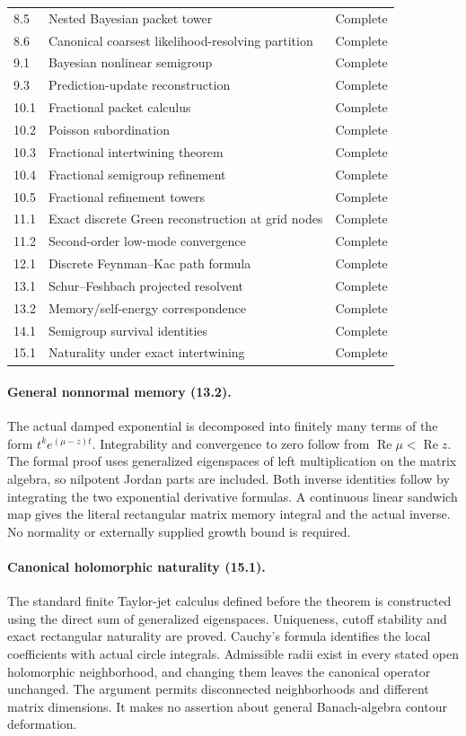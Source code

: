 \documentclass[11pt,letterpaper]{article}
\theoremstyle{plain}
\theoremstyle{plain}
\theoremstyle{plain}
\theoremstyle{definition}
\theoremstyle{definition}
\theoremstyle{definition}
\theoremstyle{definition}
\theoremstyle{definition}
\theoremstyle{remark}
\theoremstyle{remark}
\theoremstyle{remark}
\theoremstyle{remark}
\theoremstyle{remark}
\theoremstyle{remark}
\begin{document}
\begin{longtable}{@{}p{}p{}p{}@{}}
8.5 & Nested Bayesian packet tower & Complete\\
8.6 & Canonical coarsest likelihood-resolving partition & Complete\\
9.1 & Bayesian nonlinear semigroup & Complete\\
9.3 & Prediction-update reconstruction & Complete\\
10.1 & Fractional packet calculus & Complete\\
10.2 & Poisson subordination & Complete\\
10.3 & Fractional intertwining theorem & Complete\\
10.4 & Fractional semigroup refinement & Complete\\
10.5 & Fractional refinement towers & Complete\\
11.1 & Exact discrete Green reconstruction at grid nodes & Complete\\
11.2 & Second-order low-mode convergence & Complete\\
12.1 & Discrete Feynman--Kac path formula & Complete\\
13.1 & Schur--Feshbach projected resolvent & Complete\\
13.2 & Memory/self-energy correspondence & Complete\\
14.1 & Semigroup survival identities & Complete\\
15.1 & Naturality under exact intertwining & Complete\\
\end{longtable}
\normalsize

\paragraph{General nonnormal memory (13.2).}
The actual damped exponential is decomposed into finitely many terms of the form
$t^k e^{(\mu-z)t}$. Integrability and convergence to zero follow from
$\operatorname{Re}\mu<\operatorname{Re}z$. The formal proof uses generalized
eigenspaces of left multiplication on the matrix algebra, so nilpotent Jordan
parts are included. Both inverse identities follow by integrating the two
exponential derivative formulas. A continuous linear sandwich map gives the
literal rectangular matrix memory integral and the actual inverse. No normality
or externally supplied growth bound is required.

\paragraph{Canonical holomorphic naturality (15.1).}
The standard finite Taylor-jet calculus defined before the theorem is constructed
using the direct sum of generalized eigenspaces. Uniqueness, cutoff stability and
exact rectangular naturality are proved. Cauchy's formula identifies the local
coefficients with actual circle integrals. Admissible radii exist in every stated
open holomorphic neighborhood, and changing them leaves the canonical operator
unchanged. The argument permits disconnected neighborhoods and different matrix
dimensions. It makes no assertion about general Banach-algebra contour deformation.
\end{document}
